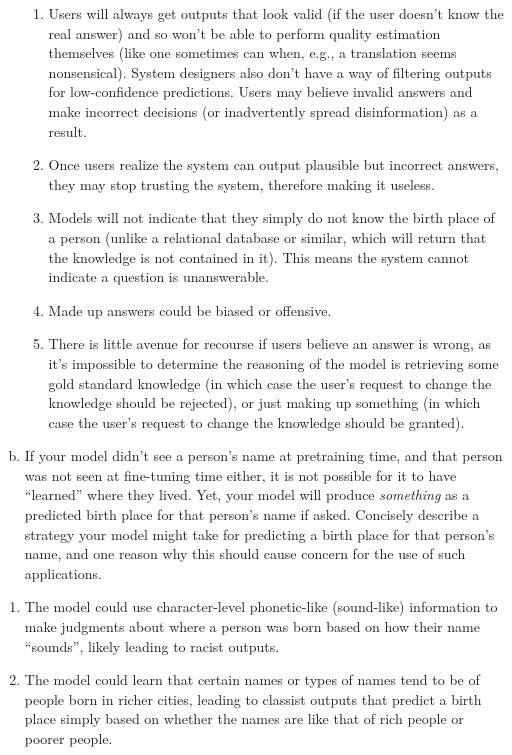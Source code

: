 \begin{enumerate}[(a)]
\begin{answer}
\begin{enumerate}
\item Users will always get outputs that look valid (if the user doesn't know the real answer) and so won't be able to perform quality estimation themselves (like one sometimes can when, e.g., a translation seems nonsensical). System designers also don't have a way of filtering outputs for low-confidence predictions. Users may believe invalid answers and make incorrect decisions (or inadvertently spread disinformation) as a result.
\item Once users realize the system can output plausible but incorrect answers, they may stop trusting the system, therefore making it useless.
\item Models will not indicate that they simply do not know the birth place of a person (unlike a relational database or similar, which will return that the knowledge is not contained in it). This means the system cannot indicate a question is unanswerable.
\item Made up answers could be biased or offensive.
\item There is little avenue for recourse if users believe an answer is wrong, as it's impossible to determine the reasoning of the model is retrieving some gold standard knowledge (in which case the user's request to change the knowledge should be rejected), or just making up something (in which case the user's request to change the knowledge should be granted).
\end{enumerate}
\end{answer}

\item
If your model didn't see a person's name at pretraining time, and that person was not seen at fine-tuning time either, it is not possible for it to have ``learned'' where they lived.
Yet, your model will produce \textit{something} as a predicted birth place for that person's name if asked.
Concisely describe a strategy your model might take for predicting a birth place for that person's name, and one reason why this should cause concern for the use of such applications.
\end{enumerate}

\begin{answer}
\begin{enumerate}
\item The model could use character-level phonetic-like (sound-like) information to make judgments about where a person was born based on how their name ``sounds'', likely leading to racist outputs.
\item The model could learn that certain names or types of names tend to be of people born in richer cities, leading to classist outputs that predict a birth place simply based on whether the names are like that of rich people or poorer people.
\end{enumerate}
\end{answer}



 
